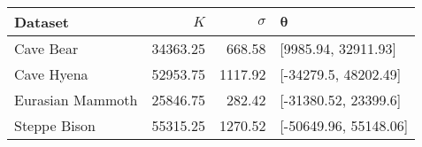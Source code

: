 
\begin{tabular}{lrrl}
\toprule
Dataset & $K$ & $\sigma$ & $\bm{\theta}$\\
\midrule
Cave Bear & 34363.25 & 668.58 & {}[9985.94, 32911.93]\\
Cave Hyena & 52953.75 & 1117.92 & {}[-34279.5, 48202.49]\\
Eurasian Mammoth & 25846.75 & 282.42 & {}[-31380.52, 23399.6]\\
Steppe Bison & 55315.25 & 1270.52 & {}[-50649.96, 55148.06]\\
\bottomrule
\end{tabular}
